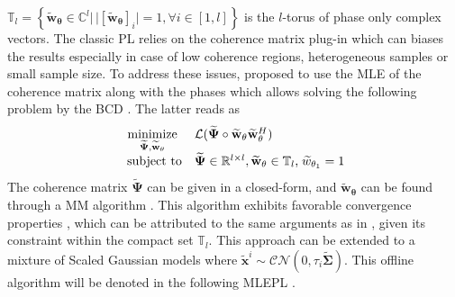     \noindent
    $\mathbb{T}_l = \left\{\mathbf{\widetilde{w}}_{\mathbf{\theta}} \in \mathbb{C}^{l} | \, |[\mathbf{\widetilde{w}}_{\mathbf{\theta}}]_i| = 1, \forall i \in [1, l]\right\}$ is the $l$-torus of phase only complex vectors. %
    The classic \acs{PL} relies on the coherence matrix plug-in which can biases the results especially in case of low coherence regions, heterogeneous samples or small sample size. To address these  issues, \citep{vu2022new, 9763551, vu2023robust} proposed to use the \acs{MLE} of the coherence matrix along with the phases which allows solving the following problem by the \ac{BCD} \citep{hong2015unified}. %
    The latter reads as
        \begin{equation}
        \label{eq:MLE_phaselinking}
            \begin{array}{cl}
            \underset{\mathbf{\widetilde{\Psi}}, \mathbf{\widetilde{w}}_{\mathbf{\theta}}}{\rm minimize}
            & 
            \mathcal{L}(\mathbf{\widetilde{\Psi}} \circ \mathbf{\widetilde{w}}_{\mathbf{\theta}}\mathbf{\widetilde{w}}_{\mathbf{\theta}}^H)
            \\
            \text{ subject to}
            & 
            \mathbf{\widetilde{\Psi}} \in \mathbb{R}^{l \times l}, \mathbf{\widetilde{w}}_{\theta} \in \mathbb{T}_{l} \text{,} \; \widetilde{w}_{\theta_1} = 1  %
            \end{array}
        \end{equation} 
        \noindent
        The coherence matrix $\mathbf{\widetilde{\Psi}}$ can be given in a closed-form, and $ \mathbf{\widetilde{w}}_{\mathbf{\theta}}$ can be found through a \acs{MM} algorithm \citep{hunter2004tutorial, sun2016majorization}. This algorithm exhibits favorable convergence properties \citep{razaviyayn2013unified}, which can be attributed to the same arguments as in \citep{soltanalian2014designing, breloy2021majorization}, given its constraint within the compact set $\mathbb{T}_{l}$. This approach can be extended to a mixture of Scaled Gaussian models \citep{ollila2012complex} where $\mathbf{\widetilde{x}}^i \sim\mathcal{CN}(0, \tau_i \mathbf{\widetilde{\Sigma}})$. This offline algorithm will be denoted in the following \acs{MLEPL} \citep{vu2023robust}.